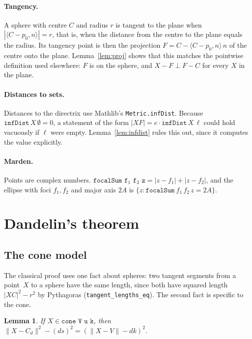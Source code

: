 \documentclass[11pt]{article}
\newtheorem{lemma}[theorem]{Lemma}
\theoremstyle{remark}
\newcommand{\lean}[1]{\texttt{#1}}
\newcommand{\ip}[2]{\langle #1,#2\rangle}
\newcommand{\nm}[1]{\lVert #1\rVert}
\begin{document}
\paragraph{Tangency.} A sphere with centre $C$ and radius $r$ is tangent to the plane when
$|\ip{C-p_0}n|=r$, that is, when the distance from the centre to the plane equals the radius. Its tangency point is then the projection
$F=C-\ip{C-p_0}n\,n$ of the centre onto the plane. Lemma~\ref{lem:proj} shows that this
matches the pointwise definition used elsewhere: $F$ is on the sphere, and $X-F\perp F-C$ for
every $X$ in the plane.

\paragraph{Distances to sets.} Distances to the directrix use Mathlib's \lean{Metric.infDist}.
Because $\lean{infDist}\,X\,\emptyset=0$, a statement of the form $|XF|=e\cdot\lean{infDist}\,X\,\ell$ could hold
vacuously if $\ell$ were empty. Lemma~\ref{lem:infdist} rules this out, since it computes the value
explicitly.

\paragraph{Marden.} Points are complex numbers. $\lean{focalSum f}_1\lean{ f}_2\lean{ z}=|z-f_1|+|z-f_2|$, and the ellipse with foci
$f_1,f_2$ and major axis $2A$ is $\{z:\lean{focalSum}\ f_1\,f_2\,z=2A\}$.

\section{Dandelin's theorem}\label{sec:dandelin}

\subsection{The cone model}\label{sec:cone}

The classical proof uses one fact about spheres: two tangent segments from a point~$X$ to a
sphere have the same length, since both have squared length $|XC|^2-r^2$ by Pythagoras
(\lean{tangent\_lengths\_eq}). The second fact is specific to the cone.

\begin{lemma}\label{lem:conetan}
If $X\in\lean{cone V u k}$, then $\nm{X-C_d}^2-(ds)^2=(\nm{X-V}-dk)^2$.
\end{lemma}
\end{document}
